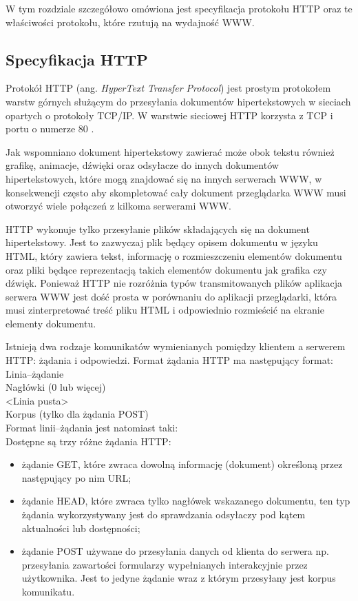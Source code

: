 W tym rozdziale 
szczegółowo omówiona jest specyfikacja protokołu HTTP oraz te właściwości protokołu, które rzutują na wydajność WWW.

\subsection{Specyfikacja HTTP}
 
Protokół HTTP (ang. \emph{HyperText Transfer Protocol}) jest prostym protokołem warstw górnych służącym do przesyłania 
dokumentów hipertekstowych w sieciach opartych o protokoły TCP/IP. W warstwie sieciowej HTTP korzysta z TCP i 
portu o numerze 80 \cite{barylo4}. 

Jak wspomniano dokument hipertekstowy zawierać może obok tekstu również grafikę, animacje, dźwięki oraz 
odsyłacze do innych dokumentów hipertekstowych, które mogą znajdować się na innych serwerach WWW, w konsekwencji 
często aby skompletować cały dokument przeglądarka WWW musi otworzyć wiele połączeń z kilkoma serwerami WWW.

HTTP wykonuje tylko przesyłanie plików składających się na dokument hipertekstowy. Jest to zazwyczaj plik 
będący opisem dokumentu w języku HTML, który zawiera tekst, informację o rozmieszczeniu elementów dokumentu oraz 
pliki będące reprezentacją takich elementów dokumentu jak grafika czy dźwięk. Ponieważ HTTP nie rozróżnia typów 
transmitowanych plików aplikacja serwera WWW jest dość prosta w porównaniu do aplikacji przeglądarki, która musi 
zinterpretować treść pliku HTML i odpowiednio rozmieścić na ekranie elementy dokumentu.

Istnieją dwa rodzaje komunikatów wymienianych pomiędzy klientem a serwerem HTTP: żądania i odpowiedzi. 
Format żądania HTTP ma następujący format:\\
	
	Linia--żądanie\\
	Nagłówki (0 lub więcej)\\
	<Linia pusta>\\
	Korpus (tylko dla żądania POST) \\

Format linii--żądania jest natomiast taki:\\
	
Dostępne są trzy różne żądania HTTP:
\begin{itemize}
\item żądanie GET, które zwraca dowolną informację (dokument) określoną przez następujący po nim URL;
\item żądanie HEAD, które zwraca tylko nagłówek wskazanego dokumentu, ten typ żądania wykorzystywany jest do sprawdzania 
odsyłaczy pod kątem aktualności lub dostępności;
\item żądanie POST używane do przesyłania danych od klienta do serwera np. przesyłania zawartości formularzy wypełnianych 
interakcyjnie przez użytkownika. Jest to jedyne żądanie wraz z którym przesyłany jest korpus komunikatu.
\end{itemize}

